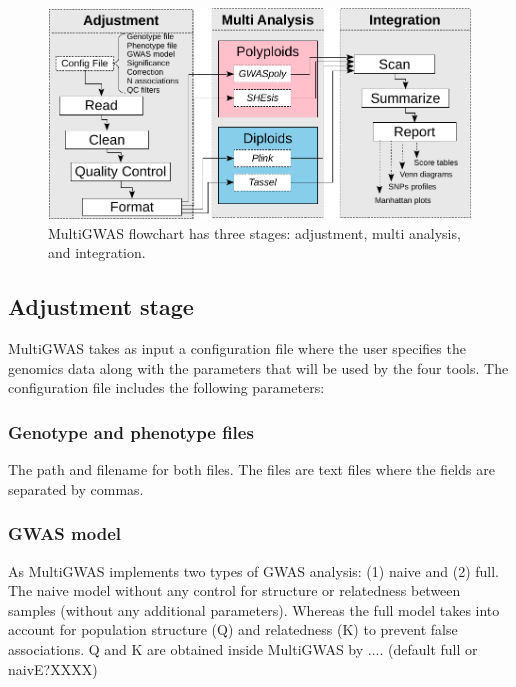 \documentclass{article}
\begin{document}
\begin{figure}
\includegraphics[width=12cm]{images/multi-gwas-flowchart-horizontal-stages-config.pdf}
\caption{MultiGWAS flowchart has three stages: adjustment, multi analysis, and integration.  }
\end{figure}

\subsection{Adjustment stage} 

MultiGWAS takes as input a configuration file where the user specifies the genomics data along with the parameters that will be used by the four tools. The configuration file includes the following parameters:


 
\subsubsection{Genotype and phenotype files}
The path and filename for both files. The files are text files where the fields are separated by commas.

\subsubsection{GWAS model}
As MultiGWAS implements two types of GWAS analysis: (1) naive and (2) full. The naive model without any control for structure or relatedness between samples (without any additional parameters). Whereas the full model  takes into account for population structure (Q) and relatedness (K) to prevent false associations. Q and K  are obtained inside MultiGWAS by .... (default full or naivE?XXXX)
\end{document}
